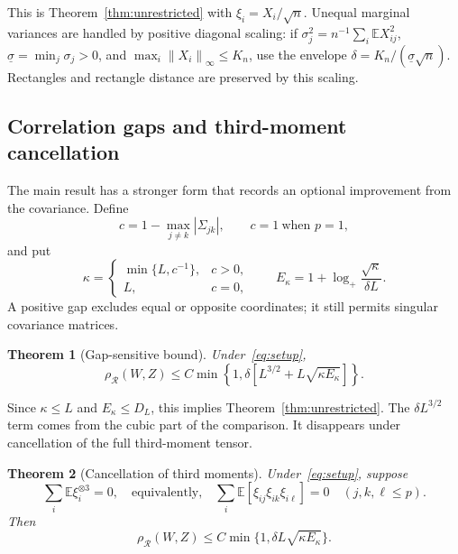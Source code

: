 \documentclass[11pt,letterpaper]{article}
\newtheorem{theorem}{Theorem}
\theoremstyle{remark}
\newcommand{\E}{\mathbb E}
\newcommand{\norm}[1]{\left\lVert#1\right\rVert}
\newcommand{\rh}{\rho_{\mathcal R}}
\begin{document}
This is Theorem~\ref{thm:unrestricted} with
\(\xi_i=X_i/\sqrt n\). Unequal marginal variances are handled by
positive diagonal scaling: if
\(\sigma_j^2=n^{-1}\sum_i\E X_{ij}^2\),
\(\underline\sigma=\min_j\sigma_j>0\), and
\(\max_i\norm{X_i}_\infty\le K_n\), use the envelope
\(\delta=K_n/(\underline\sigma\sqrt n)\). Rectangles and rectangle
distance are preserved by this scaling.

\subsection{Correlation gaps and third-moment cancellation}
The main result has a stronger form that records an optional improvement
from the covariance. Define
\[
 c=1-\max_{j\ne k}|\Sigma_{jk}|,
 \qquad c=1\ \text{when }p=1,
\]
and put
\begin{equation}
 \kappa=\begin{cases}\min\{L,c^{-1}\},&c>0,\\L,&c=0,\end{cases}
 \qquad E_\kappa=1+\log_+\frac{\sqrt\kappa}{\delta L}.
 \label{eq:parameters}
\end{equation}
A positive gap excludes equal or opposite coordinates; it still permits
singular covariance matrices.

\begin{theorem}[Gap-sensitive bound]\label{thm:optimized}
Under~\eqref{eq:setup},
\begin{equation}
 \rh(W,Z)\le C\min\!\left\{1,
 \delta[L^{3/2}+L\sqrt{\kappa E_\kappa}]\right\}.
 \tag{R*}\label{eq:optimized}
\end{equation}
\end{theorem}

Since \(\kappa\le L\) and \(E_\kappa\le D_L\), this implies
Theorem~\ref{thm:unrestricted}. The \(\delta L^{3/2}\) term comes
from the cubic part of the comparison. It disappears under cancellation
of the full third-moment tensor.

\begin{theorem}[Cancellation of third moments]\label{thm:zero-skew}
Under~\eqref{eq:setup}, suppose
\begin{equation}
 \sum_i\E\xi_i^{\otimes3}=0,
 \quad\text{equivalently,}\quad
 \sum_i\E[\xi_{ij}\xi_{ik}\xi_{i\ell}]=0
 \quad(j,k,\ell\le p).
 \label{eq:zero-third}
\end{equation}
Then
\begin{equation}
 \rh(W,Z)\le C\min\{1,\delta L\sqrt{\kappa E_\kappa}\}.
 \tag{ZS}\label{eq:zero-skew}
\end{equation}
\end{theorem}
\end{document}
